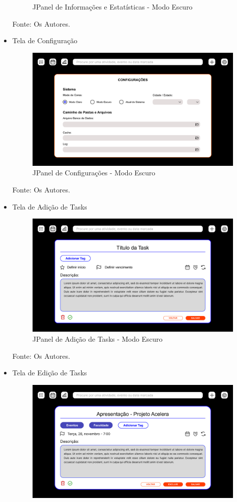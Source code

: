 \documentclass[a4paper,12pt]{article}
\begin{document}
\begin{itemize}
\begin{figure}[H]
		\caption{JPanel de Informações e Estatísticas - Modo Escuro}
	\end{figure}
	\noindent Fonte: Os Autores.
	\item Tela de Configuração
	\begin{figure}[H]
		\centering
		\includegraphics[scale=0.19]{prototypes/dark/Config Panel Window.png}
		\caption{JPanel de Configurações - Modo Escuro}
	\end{figure}
	\noindent Fonte: Os Autores.
	\pagebreak
	\item Tela de Adição de Tasks
	\begin{figure}[H]
		\centering
		\includegraphics[scale=0.19]{prototypes/dark/Add Task Panel Window.png}
		\caption{JPanel de Adição de Tasks - Modo Escuro}
	\end{figure}
	\noindent Fonte: Os Autores.
	\item Tela de Edição de Tasks
	\begin{figure}[H]
		\centering
		\includegraphics[scale=0.19]{prototypes/dark/Edit Task Panel Window.png}

\end{figure}
\end{itemize}
\end{document}
